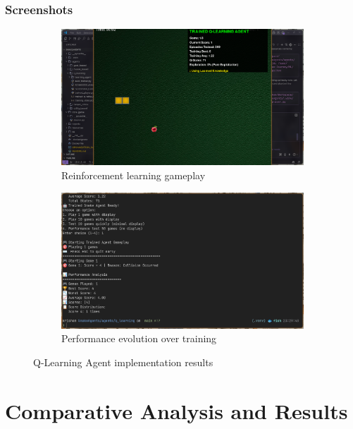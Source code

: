 \documentclass[11pt,a4paper]{article}
\begin{document}
\subsubsection{Screenshots}
\begin{figure}[H]
    \centering
    \begin{subfigure}{0.45\textwidth}
        \includegraphics[width=\textwidth]{ss/learning_play.png}
        \caption{Reinforcement learning gameplay}
    \end{subfigure}
    \hfill
    \begin{subfigure}{0.45\textwidth}
        \includegraphics[width=\textwidth]{ss/learning_score.png}
        \caption{Performance evolution over training}
    \end{subfigure}
    \caption{Q-Learning Agent implementation results}
\end{figure}

\section{Comparative Analysis and Results}
\end{document}
